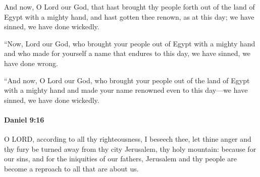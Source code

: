 			\begin{versebox}
					\item[BHS] 
					\item[LXX] 
					\item[ASV] And now, O Lord our God, that hast brought thy people forth out of the land of Egypt with a mighty hand, and hast gotten thee renown, as at this day; we have sinned, we have done wickedly.
					\item[NIV] “Now, Lord our God, who brought your people out of Egypt with a mighty hand and who made for yourself a name that endures to this day, we have sinned, we have done wrong.
					\item[NRSV] “And now, O Lord our God, who brought your people out of the land of Egypt with a mighty hand and made your name renowned even to this day—we have sinned, we have done wickedly.
			\end{versebox}

		\paragraph{Daniel 9:16} %
			\label{DANIEL-9-16}

			O LORD, according to all thy righteousness, I beseech thee, let thine anger and thy fury be turned away from thy city Jerusalem, thy holy mountain: because for our sins, and for the iniquities of our fathers, Jerusalem and thy people are become a reproach to all that are about us.

